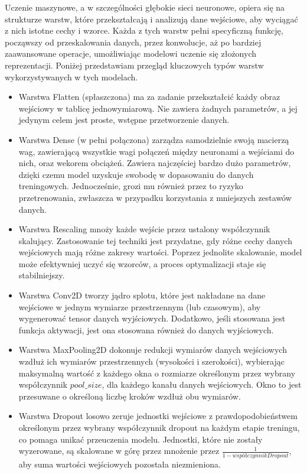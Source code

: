 Uczenie maszynowe, a w szczególności głębokie sieci neuronowe, opiera się na strukturze warstw,
które przekształcają i analizują dane wejściowe, aby wyciągać z nich istotne cechy i wzorce.
Każda z tych warstw pełni specyficzną funkcję, począwszy od przeskalowania danych, przez konwolucje,
aż po bardziej zaawansowane operacje, umożliwiając modelowi uczenie się złożonych reprezentacji.
Poniżej przedstawiam przegląd kluczowych typów warstw wykorzystywanych w tych modelach.
\begin{itemize}[label=-,labelsep=0.4cm,leftmargin=0.6cm]   
	\item Warstwa Flatten (spłaszczona) ma za zadanie przekształcić każdy obraz wejściowy w tablicę jednowymiarową.
		Nie zawiera żadnych parametrów, a jej jedynym celem jest proste, wstępne przetworzenie danych.
	\item Warstwa Dense (w pełni połączona) zarządza samodzielnie swoją macierzą wag,
		zawierającą wszystkie wagi połączeń między neuronami a wejściami do nich, oraz wekorem obciążeń.
		Zawiera najczęściej bardzo dużo parametrów, dzięki czemu model uzyskuje swobodę w dopasowaniu do danych treningowych.
		Jednocześnie, grozi mu również przez to ryzyko przetrenowania,
		zwłaszcza w przypadku korzystania z mniejszych zestawów danych.
    \item Warstwa Rescaling mnoży każde wejście przez ustalony współczynnik skalujący.
		Zastosowanie tej techniki jest przydatne, gdy różne cechy danych wejściowych mają różne zakresy wartości.
		Poprzez jednolite skalowanie, model może efektywniej uczyć się wzorców, a proces optymalizacji staje się stabilniejszy.
	\item Warstwa Conv2D tworzy jądro splotu, które jest nakładane na dane wejściowe w jednym wymiarze przestrzennym (lub czasowym), 
		aby wygenerować tensor danych wyjściowych.
		Dodatkowo, jeśli stosowana jest funkcja aktywacji, jest ona stosowana również do danych wyjściowych.
	\item Warstwa MaxPooling2D dokonuje redukcji wymiarów danych wejściowych wzdłuż ich wymiarów przestrzennych (wysokości i szerokości),
		wybierając maksymalną wartość z każdego okna o rozmiarze określonym przez wybrany współczynnik $pool\_size$,
		dla każdego kanału danych wejściowych.
		Okno to jest przesuwane o określoną liczbę kroków wzdłuż obu wymiarów.
	\item Warstwa Dropout losowo zeruje jednostki wejściowe z prawdopodobieństwem określonym
		przez wybrany współczynnik dropout na każdym etapie treningu, co pomaga unikać przeuczenia modelu.
		Jednostki, które nie zostały wyzerowane, są skalowane w górę przez mnożenie przez $\frac{1}{1 - współczynnikDropout}$,
		aby suma wartości wejściowych pozostała niezmieniona.
\end{itemize}